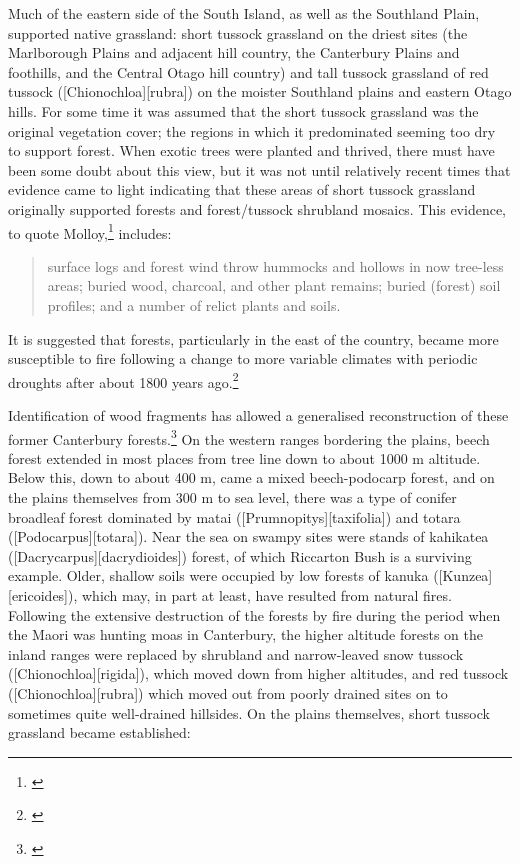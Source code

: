 Much of the eastern side of the South Island, as well as the Southland Plain, supported native grassland: short tussock grassland on the driest sites (the Marlborough Plains and adjacent hill country, the Canterbury Plains and foothills, and the Central Otago hill country) and tall tussock grassland of red tussock ([Chionochloa][rubra]) on the moister Southland plains and eastern Otago hills.
For some time it was assumed that the short tussock grassland was the original vegetation cover; the regions in which it predominated seeming too dry to support forest.
When exotic trees were planted and thrived, there must have been some doubt about this view, but it was not until relatively recent times that evidence came to light indicating that these areas of short tussock grassland originally supported forests and forest/tussock shrubland mosaics.
This evidence, to quote Molloy,\footnote{\cite{molloybpj1963distribution}} includes:

\begin{quote}
	surface logs and forest wind throw hummocks and hollows in now tree-less areas; buried wood, charcoal, and other plant remains; buried (forest) soil profiles; and a number of relict plants and soils.
\end{quote}

It is suggested that forests, particularly in the east of the country, became more susceptible to fire following a change to more variable climates with periodic droughts after about 1800 years ago.\footnote{\cite{mcglone1977ascarina}}

Identification of wood fragments has allowed a generalised reconstruction of these former Canterbury forests.\footnote{\cite{molloy1969recent}}
On the western ranges bordering the plains, beech forest extended in most places from tree line down to about 1000 m altitude.
Below this, down to about 400 m, came a mixed beech-podocarp forest, and on the plains themselves from 300 m to sea level, there was a type of conifer broadleaf forest dominated by matai ([Prumnopitys][taxifolia]) and totara ([Podocarpus][totara]).
Near the sea on swampy sites were stands of kahikatea ([Dacrycarpus][dacrydioides]) forest, of which Riccarton Bush is a surviving example.
Older, shallow soils were occupied by low forests of kanuka ([Kunzea][ericoides]), which may, in part at least, have resulted from natural fires.
Following the extensive destruction of the forests by fire during the period when the Maori was hunting moas in Canterbury, the higher altitude forests on the inland ranges were replaced by shrubland and narrow-leaved snow tussock ([Chionochloa][rigida]), which moved down from higher altitudes, and red tussock ([Chionochloa][rubra]) which moved out from poorly drained sites on to sometimes quite well-drained hillsides.
On the plains themselves, short tussock grassland became established:

